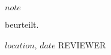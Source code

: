 
\parindent=0pt
\begin{center}
    \textcolor{headcolor}{\textbf{$note$}}
\end{center}

\parindent=0pt
beurteilt.

\bigskip
\bigskip
\bigskip
\parindent=0pt
$location$, $date$\newline
REVIEWER\newline





